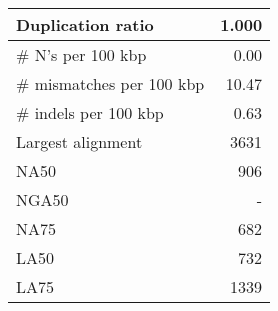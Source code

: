 \documentclass[12pt,a4paper]{article}
\begin{document}
\begin{table}[ht]
\begin{center}
\begin{tabular}{|l*{1}{|r}|}
Duplication ratio & 1.000 \\ \hline
\# N's per 100 kbp & 0.00 \\ \hline
\# mismatches per 100 kbp & 10.47 \\ \hline
\# indels per 100 kbp & 0.63 \\ \hline
Largest alignment & 3631 \\ \hline
NA50 & 906 \\ \hline
NGA50 & - \\ \hline
NA75 & 682 \\ \hline
LA50 & 732 \\ \hline
LA75 & 1339 \\ \hline
\end{tabular}
\end{center}
\end{table}
\end{document}
